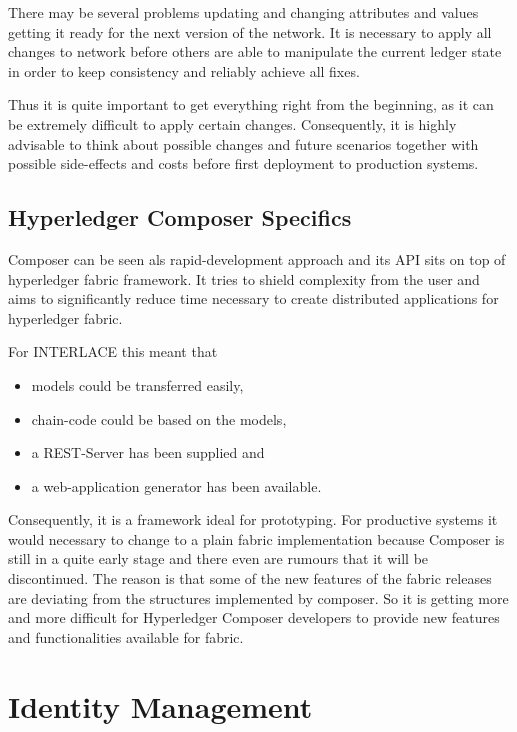 There may be several problems updating and changing attributes and values getting it ready for the next version of the network. It is necessary to apply all changes to network before others are able to manipulate the current ledger state in order to keep consistency and reliably achieve all fixes.

Thus it is quite important to get everything right from the beginning, as it can be extremely difficult to apply certain changes. Consequently, it is highly advisable to think about possible changes and future scenarios together with possible side-effects and costs before first deployment to production systems.

\subsection{Hyperledger Composer Specifics}

Composer can be seen als rapid-development approach and its API sits on top of hyperledger fabric framework. It tries to shield complexity from the user and aims to significantly reduce time necessary to create distributed applications for hyperledger fabric.

For INTERLACE this meant that

\begin{itemize}
	\item models could be transferred easily,
	\item chain-code could be based on the models,
	\item a REST-Server has been supplied and
	\item a web-application generator has been available.
\end{itemize}

Consequently, it is a framework ideal for prototyping. For productive systems it would necessary to change to a plain fabric implementation because Composer is still in a quite early stage and there even are rumours that it will be discontinued. The reason is that some of the new features of the fabric releases are deviating from the structures implemented by composer. So it is getting more and more difficult for Hyperledger Composer developers to provide new features and functionalities available for fabric.

\section{Identity Management}
\label{sec:id-management}

